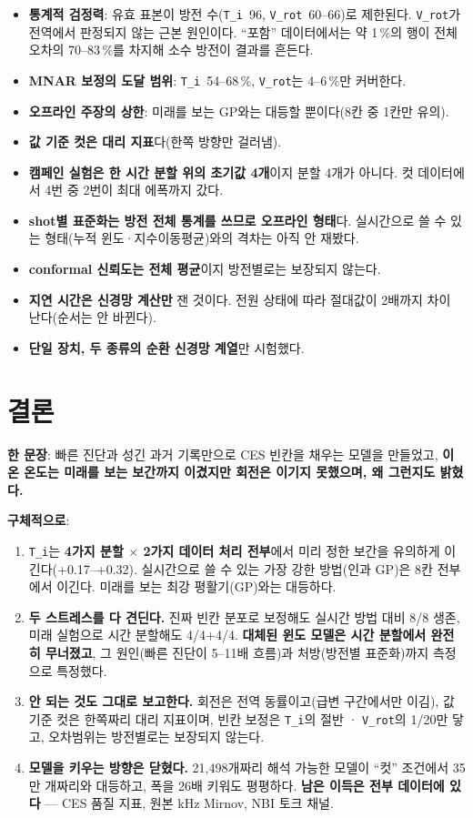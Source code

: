 \documentclass[10pt]{article}
\newcommand{\Ti}{\texttt{T\_i}}
\newcommand{\Vrot}{\texttt{V\_rot}}
\begin{document}
\begin{itemize}
\item \textbf{통계적 검정력}: 유효 표본이 방전 수(\Ti\ 96, \Vrot\ 60--66)로 제한된다.
  \Vrot 가 전역에서 판정되지 않는 근본 원인이다. ``포함'' 데이터에서는 약 1\,\%의 행이 전체
  오차의 70--83\,\%를 차지해 소수 방전이 결과를 흔든다.
\item \textbf{MNAR 보정의 도달 범위}: \Ti\ 54--68\,\%, \Vrot 는 4--6\,\%만 커버한다.
\item \textbf{오프라인 주장의 상한}: 미래를 보는 GP와는 대등할 뿐이다(8칸 중 1칸만 유의).
\item \textbf{값 기준 컷은 대리 지표}다(한쪽 방향만 걸러냄).
\item \textbf{캠페인 실험은 한 시간 분할 위의 초기값 4개}이지 분할 4개가 아니다. 컷
  데이터에서 4번 중 2번이 최대 에폭까지 갔다.
\item \textbf{shot별 표준화는 방전 전체 통계를 쓰므로 오프라인 형태}다. 실시간으로 쓸 수 있는
  형태(누적 윈도·지수이동평균)와의 격차는 아직 안 재봤다.
\item \textbf{conformal 신뢰도는 전체 평균}이지 방전별로는 보장되지 않는다.
\item \textbf{지연 시간은 신경망 계산만} 잰 것이다. 전원 상태에 따라 절대값이 2배까지 차이
  난다(순서는 안 바뀐다).
\item \textbf{단일 장치, 두 종류의 순환 신경망 계열}만 시험했다.
\end{itemize}

\section{결론}

\textbf{한 문장}: 빠른 진단과 성긴 과거 기록만으로 CES 빈칸을 채우는 모델을 만들었고,
\textbf{이온 온도는 미래를 보는 보간까지 이겼지만 회전은 이기지 못했으며, 왜 그런지도
밝혔다.}

\textbf{구체적으로}:
\begin{enumerate}
\item \Ti 는 \textbf{4가지 분할 $\times$ 2가지 데이터 처리 전부}에서 미리 정한 보간을
  유의하게 이긴다(+0.17--+0.32). 실시간으로 쓸 수 있는 가장 강한 방법(인과 GP)은 8칸 전부에서
  이긴다. 미래를 보는 최강 평활기(GP)와는 대등하다.
\item \textbf{두 스트레스를 다 견딘다.} 진짜 빈칸 분포로 보정해도 실시간 방법 대비 8/8 생존,
  미래 실험으로 시간 분할해도 4/4+4/4. \textbf{대체된 윈도 모델은 시간 분할에서 완전히
  무너졌고}, 그 원인(빠른 진단이 5--11배 흐름)과 처방(방전별 표준화)까지 측정으로 특정했다.
\item \textbf{안 되는 것도 그대로 보고한다.} 회전은 전역 동률이고(급변 구간에서만 이김),
  값 기준 컷은 한쪽짜리 대리 지표이며, 빈칸 보정은 \Ti 의 절반 · \Vrot 의 1/20만 닿고,
  오차범위는 방전별로는 보장되지 않는다.
\item \textbf{모델을 키우는 방향은 닫혔다.} 21{,}498개짜리 해석 가능한 모델이 ``컷''
  조건에서 35만 개짜리와 대등하고, 폭을 26배 키워도 평평하다. \textbf{남은 이득은 전부
  데이터에 있다} --- CES 품질 지표, 원본 kHz Mirnov, NBI 토크 채널.
\end{enumerate}
\end{document}
